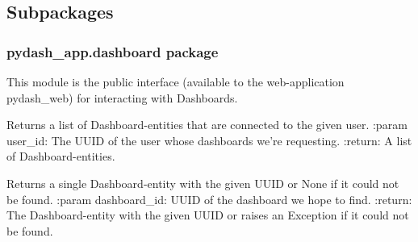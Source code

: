 \documentclass[letterpaper,10pt,english]{sphinxmanual}
\begin{document}
\subsection{Subpackages}
\label{\detokenize{pydash_app:subpackages}}

\subsubsection{pydash\_app.dashboard package}
\label{\detokenize{pydash_app.dashboard::doc}}\label{\detokenize{pydash_app.dashboard:module-pydash_app.dashboard}}\label{\detokenize{pydash_app.dashboard:pydash-app-dashboard-package}}
This module is the public interface (available to the web-application pydash\_web)
for interacting with Dashboards.

\begin{fulllineitems}
\label{\detokenize{pydash_app.dashboard:pydash_app.dashboard.add_to_repository}}
\end{fulllineitems}


\begin{fulllineitems}
\label{\detokenize{pydash_app.dashboard:pydash_app.dashboard.dashboards_of_user}}
Returns a list of Dashboard-entities that are connected to the given user.
:param user\_id: The UUID of the user whose dashboards we’re requesting.
:return: A list of Dashboard-entities.

\end{fulllineitems}


\begin{fulllineitems}
\label{\detokenize{pydash_app.dashboard:pydash_app.dashboard.find}}
Returns a single Dashboard-entity with the given UUID or None if it could not be found.
:param dashboard\_id: UUID of the dashboard we hope to find.
:return: The Dashboard-entity with the given UUID or raises an Exception if it could not be found.

\end{fulllineitems}
\end{document}
